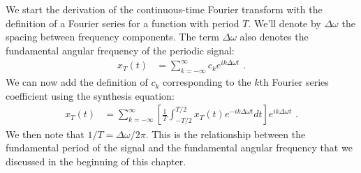 We start the derivation of the continuous-time Fourier transform with the definition of a Fourier series for a
function with period $T$. We'll denote by $\Delta \omega$ the spacing between frequency components.
The term $\Delta \omega$ also denotes the fundamental angular frequency of the periodic signal:
\begin{align}
  x_{T}(t) & = \sum_{k=-\infty}^{\infty} c_k e^{ik\Delta \omega t}  \,\,.
\end{align}
We can now add the definition of $c_k$ corresponding to the $k$th Fourier series coefficient using the synthesis equation:
\begin{align}
  x_{T}(t) & = \sum_{k=-\infty}^{\infty} \left[\frac{1}{T}\int_{-T/2}^{T/2} x_{T}(t) e^{-ik\Delta \omega t} dt\right]  e^{ik\Delta \omega t}  \,\,.
\end{align}
We then note that $1/T = \Delta \omega/2\pi$. This is the relationship between the fundamental period of
the signal and the fundamental angular frequency that we discussed in the beginning of this chapter.

